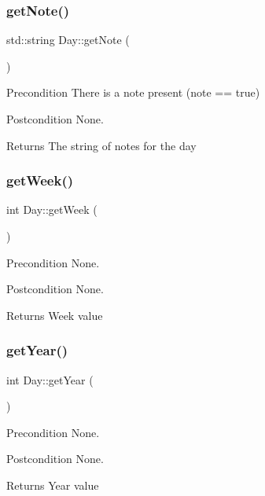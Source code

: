\subsubsection{\texorpdfstring{get\+Note()}{getNote()}}
{\footnotesize\ttfamily std\+::string Day\+::get\+Note (\begin{DoxyParamCaption}{ }\end{DoxyParamCaption})}

\begin{DoxyPrecond}{Precondition}
There is a note present (note == true) 
\end{DoxyPrecond}
\begin{DoxyPostcond}{Postcondition}
None. 
\end{DoxyPostcond}
\begin{DoxyReturn}{Returns}
The string of notes for the day 
\end{DoxyReturn}
\hypertarget{class_day_a43799b84e1a16df9bf16b3de69605b9a}{}\label{class_day_a43799b84e1a16df9bf16b3de69605b9a} 
\subsubsection{\texorpdfstring{get\+Week()}{getWeek()}}
{\footnotesize\ttfamily int Day\+::get\+Week (\begin{DoxyParamCaption}{ }\end{DoxyParamCaption})}

\begin{DoxyPrecond}{Precondition}
None. 
\end{DoxyPrecond}
\begin{DoxyPostcond}{Postcondition}
None. 
\end{DoxyPostcond}
\begin{DoxyReturn}{Returns}
Week value 
\end{DoxyReturn}
\hypertarget{class_day_acec9a2c25c4e19fa6f46cd2671dfa51d}{}\label{class_day_acec9a2c25c4e19fa6f46cd2671dfa51d} 
\subsubsection{\texorpdfstring{get\+Year()}{getYear()}}
{\footnotesize\ttfamily int Day\+::get\+Year (\begin{DoxyParamCaption}{ }\end{DoxyParamCaption})}

\begin{DoxyPrecond}{Precondition}
None. 
\end{DoxyPrecond}
\begin{DoxyPostcond}{Postcondition}
None. 
\end{DoxyPostcond}
\begin{DoxyReturn}{Returns}
Year value 
\end{DoxyReturn}
\hypertarget{class_day_aa4dd0d85c6fa11300b10c2a40c530c4f}{}\label{class_day_aa4dd0d85c6fa11300b10c2a40c530c4f} 
